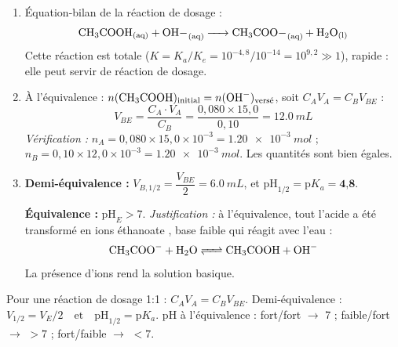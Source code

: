\documentclass[11pt]{article}
\newcounter{popsec}
\newcounter{popsub}
\newcommand{\courssub}[1]{%
  \stepcounter{popsub}%
  \par\vspace{9pt}\noindent{\popxbold\fontsize{11.5}{13}\selectfont\color{popink}{\color{poporange}\thepopsec.\thepopsub}\hspace{6pt}#1}\par\nopagebreak\vspace{4pt}
}
\begin{document}
\courssub{Je m'entraîne}

\begin{corrige}
\begin{enumerate}
\item Équation-bilan de la réaction de dosage :
\[ \ce{CH3COOH_{(aq)} + OH-_{(aq)} -> CH3COO-_{(aq)} + H2O_{(l)}} \]
Cette réaction est totale ($K = K_a/K_e = 10^{-4,8}/10^{-14} = 10^{9,2} \gg 1$), rapide : elle peut servir de réaction de dosage.

\item À l'équivalence : $n(\ce{CH3COOH})_{\text{initial}} = n(\ce{OH-})_{\text{versé}}$, soit $C_A V_A = C_B V_{BE}$ :
\[ V_{BE} = \frac{C_A \cdot V_A}{C_B} = \frac{0,080 \times 15,0}{0,10} = \SI{12,0}{mL} \]
\emph{Vérification :} $n_A = 0,080 \times 15,0 \times 10^{-3} = \SI{1,20e-3}{mol}$ ; $n_B = 0,10 \times 12,0 \times 10^{-3} = \SI{1,20e-3}{mol}$. Les quantités sont bien égales.

\item \textbf{Demi-équivalence :} $V_{B,1/2} = \dfrac{V_{BE}}{2} = \SI{6,0}{mL}$, et $\mathrm{pH}_{1/2} = \mathrm{p}K_a = \textbf{4,8}$.

\textbf{Équivalence :} $\mathrm{pH}_E > 7$. \emph{Justification :} à l'équivalence, tout l'acide a été transformé en ions éthanoate , base faible qui réagit avec l'eau :
\[ \ce{CH3COO- + H2O <=> CH3COOH + OH-} \]
La présence d'ions  rend la solution basique.
\end{enumerate}
\end{corrige}

\begin{aretenir}
Pour une réaction de dosage 1:1 : $\boxed{C_A V_A = C_B V_{BE}}$.
Demi-équivalence : $\boxed{V_{1/2} = V_E/2 \quad \text{et} \quad \mathrm{pH}_{1/2} = \mathrm{p}K_a}$.
pH à l'équivalence : fort/fort $\to$ 7 ; faible/fort $\to$ $>7$ ; fort/faible $\to$ $<7$.
\end{aretenir}
\end{document}
